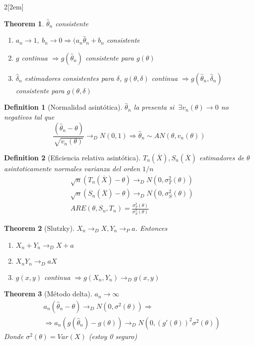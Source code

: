 \documentclass[leqno]{article}
\newtheorem*{theorem}{Theorem}
\newtheorem*{definition}{Definition}
\begin{document}
\begin{multicols}{2}[\columnsep2em]
\begin{theorem} $\hat{\theta }_n$ consistente
  \begin{enumerate}[topsep=-6pt, itemsep=0pt]
    \item $a_n \to  1, \ b_n \to  0 \Rightarrow (a_n \hat{\theta }_n + b_n$ consistente
	\item $g$ continua $\Rightarrow g(\hat{\theta}_n)$ consistente para $g(\theta)$
	\item $\hat{\delta}_n$ estimadores consistentes para $\delta$, $g(\theta , \delta)$ continua  $\Rightarrow g(\hat{\theta }_n, \hat{\delta}_n)$ consistente para $g(\theta , \delta)$
  \end{enumerate}
\end{theorem}

\begin{definition}[Normalidad asintótica]  $\hat{\theta }_n$ la presenta si $\ \exists v_n(\theta ) \to  0$ no negativos tal que
  \[
	\frac{(\hat{\theta }_n-\theta )}{\sqrt{v_n(\theta )} } \to_D N(0,1) \Rightarrow \hat{\theta }_n \sim AN(\theta , v_n(\theta ))
  \] 
\end{definition}

\begin{definition}[Eficiencia relativa asintótica] $T_n(\overline{X}), S_n(\overline{X})$ estimadores de $\theta$ asintoticamente normales varianza del orden $1 / n$
  \begin{align*}
	 &\sqrt{n}(T_n(\overline{X})-\theta )  \to _D N(0, \sigma_T^2(\theta)) \\
	 &\sqrt{n}(S_n(\overline{X})-\theta )  \to _D N(0, \sigma_S^2(\theta)) \\
	 &ARE(\theta, S_n, T_n) = \frac{\sigma ^2_T(\theta )}{\sigma ^2_S(\theta )}
  \end{align*}

\end{definition}

\begin{theorem}[Slutzky] $X_n \to _D X, Y_n \to _P a$. Entonces
  \begin{enumerate}[topsep=-6pt, itemsep=0pt]
	\item $X_n + Y_n \to _D X+a$ 
	\item $X_nY_n \to _D aX$
	\item $g(x,y)$ continua  $\Rightarrow g(X_n, Y_n) \to _D g(x,y)$
  \end{enumerate}
\end{theorem}

\begin{theorem}[Método delta] $a_n \to \infty$
  \begin{align*}
  &a_n(\hat{\theta }_n-\theta ) \to _D N(0, \sigma ^2(\theta )) \Rightarrow \\
  & \Rightarrow a_n(g(\hat{\theta }_n)-g(\theta) ) \to _D N(0, (g'(\theta ))^2 \sigma ^2(\theta ))
  \end{align*}
  Donde $\sigma ^2(\theta) = Var(X)$ (estoy 0 seguro)
\end{theorem}






\end{multicols}
\end{document}
